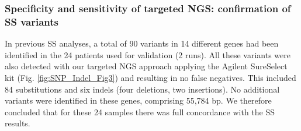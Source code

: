 \begin{table}[!ht] %
	\caption[Overview of the Sequence Performance for the Validation Runs]{\label{table:SNP_Indel_performance} Overview of the Sequence Performance for the Validation Runs}
	\tiny
\end{table}


\subsubsection{Specificity and sensitivity of targeted NGS: confirmation of SS variants}
In previous SS analyses, a total of 90 variants in 14 different genes had been identified in the 24 patients used for validation (2 runs). 
All these variants were also detected with our targeted NGS approach applying the Agilent SureSelect kit (Fig. \ref{fig:SNP_Indel_Fig3}) and resulting in no false negatives. 
This included 84 substitutions and six indels (four deletions, two insertions). 
No additional variants were identified in these genes, comprising 55,784 bp. 
We therefore concluded that for these 24 samples there was full concordance with the SS results.

